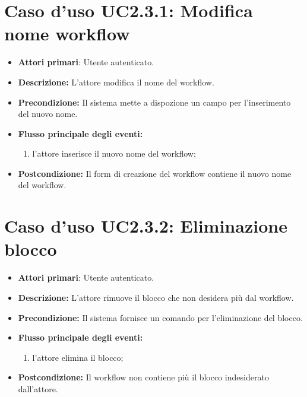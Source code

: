 		\section{Caso d'uso UC2.3.1: Modifica nome workflow}
		\begin{itemize}
			\item \textbf{Attori primari}: Utente autenticato.
			\item \textbf{Descrizione:} L'attore modifica il nome del workflow.
			\item \textbf{Precondizione:} Il sistema mette a dispozione un campo per l'inserimento del nuovo nome.
			\item \textbf{Flusso principale degli eventi:}
			\begin{enumerate}
				\item l'attore inserisce il nuovo nome del workflow;
			\end{enumerate}
			\item \textbf{Postcondizione:} Il form di creazione del workflow contiene il nuovo nome del workflow.
		\end{itemize}
		\section{Caso d'uso UC2.3.2: Eliminazione blocco }
		\begin{itemize}
			\item \textbf{Attori primari}: Utente autenticato.
			\item \textbf{Descrizione:} L'attore rimuove il blocco che non desidera più dal workflow.
			\item \textbf{Precondizione:} Il sistema fornisce un comando per l'eliminazione del blocco.
			\item \textbf{Flusso principale degli eventi:}
			\begin{enumerate}
				\item l'attore elimina il blocco;
			\end{enumerate}
			\item \textbf{Postcondizione:} Il workflow non contiene più il blocco indesiderato dall'attore.
		\end{itemize}
